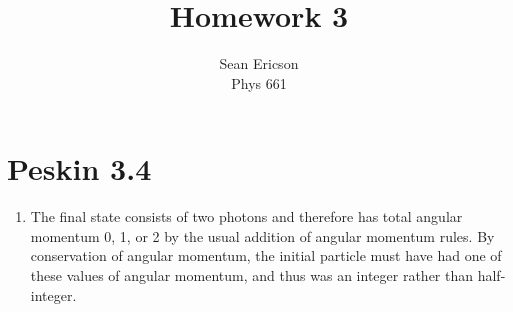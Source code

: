 \documentclass[12pt]{article}
\begin{document}
\title{Homework 3}
\author{Sean Ericson \\ Phys 661}
\maketitle

\section*{Peskin 3.4}
\begin{enumerate}[label=(\alph*)]
    \item The final state consists of two photons and therefore has total angular momentum 0, 1, or 2 by the usual addition of angular momentum rules. By conservation of angular momentum, the initial particle must have had one of these values of angular momentum, and thus was an integer rather than half-integer.
    

\end{enumerate}
\end{document}

